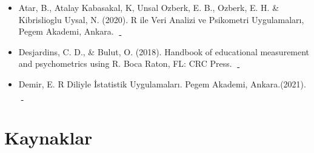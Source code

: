 \documentclass[
  oneside]{book}
\begin{document}
\begin{itemize}
\item
  Atar, B., Atalay Kabasakal, K, Unsal Ozberk, E. B., Ozberk, E. H. \& Kibrislioglu Uysal, N. (2020). R ile Veri Analizi ve Psikometri Uygulamaları, Pegem Akademi, Ankara.🔗 \href{https://pegem.net/urun/R-ile-Veri-Analizi-ve-Psikometri-Uygulamalari/60801}{📖}
\item
  Desjardins, C. D., \& Bulut, O. (2018). Handbook of educational measurement and psychometrics using R. Boca Raton, FL: CRC Press. 🔗\href{https://www.routledge.com/Handbook-of-Educational-Measurement-and-Psychometrics-Using-R/Desjardins-Bulut/p/book/9780367734671}{📖}
\item
  Demir, E. R Diliyle İstatistik Uygulamaları. Pegem Akademi, Ankara.(2021). 🔗\href{https://pegem.net/urun/R-Diliyle-Istatistik-Uygulamalari/61912}{📖}
\end{itemize}

\hypertarget{kaynaklar}{%
\section*{Kaynaklar}\label{kaynaklar}}
\end{document}
